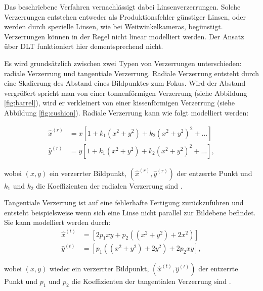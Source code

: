 Das beschriebene Verfahren vernachlässigt dabei Linsenverzerrungen. Solche Verzerrungen entstehen entweder als Produktionsfehler günstiger Linsen, oder werden durch spezielle Linsen, wie bei Weitwinkelkameras, begünstigt.  Verzerrungen können in der Regel nicht linear modelliert werden. Der Ansatz über DLT funktioniert hier dementsprechend nicht.

Es wird grundsätzlich zwischen zwei Typen von Verzerrungen unterschieden: radiale Verzerrung und tangentiale Verzerrung.
Radiale Verzerrung entsteht durch eine Skalierung des Abstand eines Bildpunktes zum Fokus. Wird der Abstand vergrößert spricht man von einer tonnenförmigen Verzerrung (siehe Abbildung \ref{fig:barrel}), wird er verkleinert von einer kissenförmigen Verzerrung (siehe Abbildung \ref{fig:cushion}).
Radiale Verzerrung kann wie folgt modelliert werden:

\[
\begin{aligned}
\hat{x}^{(r)} &= x\left[1 + k_1\left(x^2 + y^2\right) + k_2\left(x^2 + y^2\right)^2 + \dotsc\right] \\
\hat{y}^{(r)} &= y\left[1 + k_1\left(x^2 + y^2\right) + k_2\left(x^2 + y^2\right)^2 + \dotsc\right],
\end{aligned}
\]

wobei $(x,y)$ ein verzerrter Bildpunkt, $(\hat{x}^{(r)}, \hat{y}^{(r)})$ der entzerrte Punkt und $k_1$ und $k_2$ die Koeffizienten der radialen Verzerrung sind \cite{Zhang2002}.

Tangentiale Verzerrung ist auf eine fehlerhafte Fertigung zurückzuführen und entsteht beispielsweise wenn sich eine Linse nicht parallel zur Bildebene befindet.
Sie kann modelliert werden durch:
\[
\begin{aligned}
\hat{x}^{(t)} &= \left[2p_1xy + p_2\left((x^2 + y^2) + 2x^2\right)\right] \\
\hat{y}^{(t)} &= \left[p_1\left((x^2 + y^2) + 2y^2\right) + 2p_2xy\right],
\end{aligned}
\]

wobei $(x,y)$ wieder ein verzerrter Bildpunkt, $(\hat{x}^{(t)}, \hat{y}^{(t)})$ der entzerrte Punkt und $p_1$ und $p_2$ die Koeffizienten der tangentialen Verzerrung sind \cite{Heikkila1997}.

